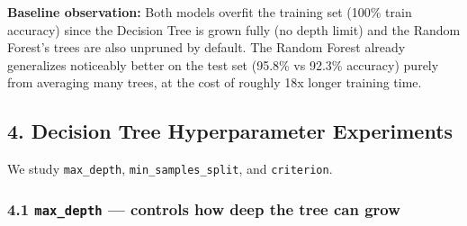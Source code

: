 \documentclass[11pt]{article}
\begin{document}
    \textbf{Baseline observation:} Both models overfit the training set
(100\% train accuracy) since the Decision Tree is grown fully (no depth
limit) and the Random Forest's trees are also unpruned by default. The
Random Forest already generalizes noticeably better on the test set
(95.8\% vs 92.3\% accuracy) purely from averaging many trees, at the
cost of roughly 18x longer training time.

    \subsection{4. Decision Tree Hyperparameter
Experiments}\label{decision-tree-hyperparameter-experiments}

We study \texttt{max\_depth}, \texttt{min\_samples\_split}, and
\texttt{criterion}.

    \subsubsection{\texorpdfstring{4.1 \texttt{max\_depth} --- controls how
deep the tree can
grow}{4.1 max\_depth --- controls how deep the tree can grow}}\label{max_depth-controls-how-deep-the-tree-can-grow}
\end{document}
